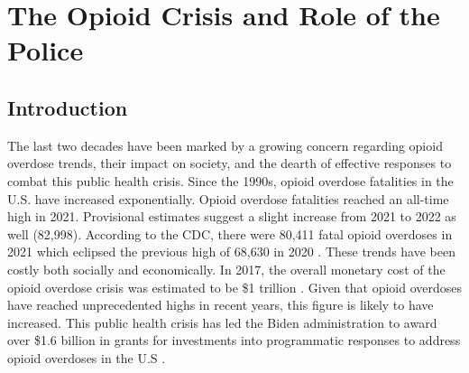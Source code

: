 \chapter{The Opioid Crisis and Role of the Police}

%
\section{Introduction}

The last two decades have been marked by a growing concern regarding opioid overdose trends, their impact on society, and the dearth of effective responses to combat this public health crisis. Since the 1990s, opioid overdose fatalities in the U.S. have increased exponentially. Opioid overdose fatalities reached an all-time high in 2021. Provisional estimates suggest a slight increase from 2021 to 2022 as well (82,998). According to the CDC, there were 80,411 fatal opioid overdoses in 2021 which eclipsed the previous high of 68,630 in 2020 \parencite{national_institute_on_drug_abuse_drug_2023}. These trends have been costly both socially and economically. In 2017, the overall monetary cost of the opioid overdose crisis was estimated to be \$1 trillion \parencite{luo_state-level_2021}. Given that opioid overdoses have reached unprecedented highs in recent years, this figure is likely to have increased. This public health crisis has led the Biden administration to award over \$1.6 billion in grants for investments into programmatic responses to address opioid overdoses in the U.S \parencite{us_department_of_health_and_human_services_biden-harris_2022}.

